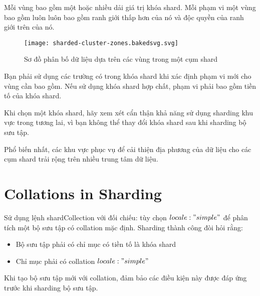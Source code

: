 Mỗi vùng bao gồm một hoặc nhiều dải giá trị khóa shard. Mỗi phạm vi một vùng bao gồm luôn luôn bao gồm ranh giới thấp hơn của nó và độc quyền của ranh giới trên của nó.

\begin{figure}[h!]
\centering
\captionsetup{justification=centering,margin=1cm}
  	\texttt{[image: sharded-cluster-zones.bakedsvg.svg]}
  \caption{Sơ đồ phân bố dữ liệu dựa trên các vùng trong một cụm shard}
  \end{figure}

Bạn phải sử dụng các trường có trong khóa shard khi xác định phạm vi mới cho vùng cần bao gồm. Nếu sử dụng khóa shard hợp chất, phạm vi phải bao gồm tiền tố của khóa shard. 

Khi chọn một khóa shard, hãy xem xét cẩn thận khả năng sử dụng sharding khu vực trong tương lai, vì bạn không thể thay đổi khóa shard sau khi sharding bộ sưu tập.

Phổ biến nhất, các khu vực phục vụ để cải thiện địa phương của dữ liệu cho các cụm shard trải rộng trên nhiều trung tâm dữ liệu.

\section{Collations in Sharding}
Sử dụng lệnh shardCollection với đối chiếu: tùy chọn ${locale: "simple"}$ để phân tích một bộ sưu tập có collation mặc định. Sharding thành công đòi hỏi rằng:
\begin{itemize}
\item Bộ sưu tập phải có chỉ mục có tiền tố là khóa shard
\item Chỉ mục phải có collation ${locale: "simple"}$
\end{itemize}
Khi tạo bộ sưu tập mới với collation, đảm bảo các điều kiện này được đáp ứng trước khi sharding bộ sưu tập.